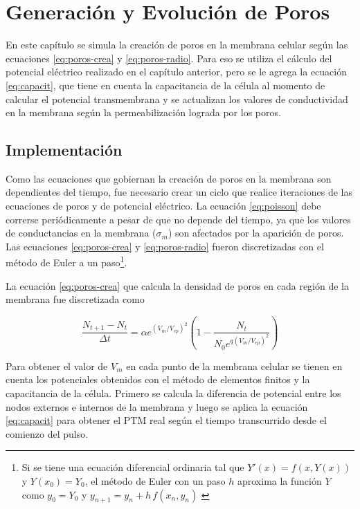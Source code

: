 \chapter{Generación y Evolución de Poros} \label{chap:poros}

En este capítulo se simula la creación de poros en la membrana celular según las ecuaciones \ref{eq:poros-crea} y \ref{eq:poros-radio}. Para eso se utiliza el cálculo del potencial eléctrico realizado en el capítulo anterior, pero se le agrega la ecuación \ref{eq:capacit}, que tiene en cuenta la capacitancia de la célula al momento de calcular el potencial transmembrana y se actualizan los valores de conductividad en la membrana según la permeabilización lograda por los poros.

\section{Implementación}

Como las ecuaciones que gobiernan la creación de poros en la membrana son dependientes del tiempo, fue necesario crear un ciclo que realice iteraciones de las ecuaciones de poros y de potencial eléctrico. La ecuación \ref{eq:poisson} debe correrse periódicamente a pesar de que no depende del tiempo, ya que los valores de conductancias en la membrana ($\sigma_{m}$) son afectados por la aparición de poros. Las ecuaciones \ref{eq:poros-crea} y \ref{eq:poros-radio} fueron discretizadas con el método de Euler a un paso\footnote{Si se tiene una ecuación diferencial ordinaria tal que $Y'(x) = f(x, Y(x))$ y $Y(x_0) = Y_0$, el método de Euler con un paso $h$ aproxima la función $Y$ como $y_0 = Y_0$ y $y_{n+1} = y_n + h\,f(x_n, y_n)$ \cite{kendall}}.

La ecuación \ref{eq:poros-crea} que calcula la densidad de poros en cada región de la membrana fue discretizada como


\begin{equation} \label{eq:poros-crea-disc}
	\frac{N_{t+1} - N_{t}}{\Delta t} = \alpha e^{(V_m/V_{ep})^2} \left( 1 - \frac{N_{t}}{N_0 e^{q \left(V_m / V_{ep} \right) ^2}} \right)
\end{equation}

Para obtener el valor de $V_m$ en cada punto de la membrana celular se tienen en cuenta los potenciales obtenidos con el método de elementos finitos y la capacitancia de la célula. Primero se calcula la diferencia de potencial entre los nodos externos e internos de la membrana y luego se aplica la ecuación \ref{eq:capacit} para obtener el PTM real según el tiempo transcurrido desde el comienzo del pulso.

